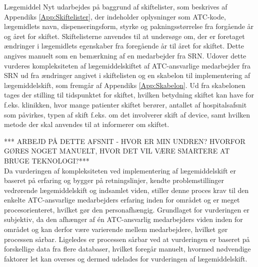 Lægemiddel Nyt udarbejdes på baggrund af skiftelister, som beskrives af Appendiks \ref{App:Skiftelister}, der indeholder oplysninger som ATC-kode, lægemidlets navn, dispenseringsform, styrke og pakningsstørrelse fra forgående år og året for skiftet. Skiftelisterne anvendes til at undersøge om, der er foretaget ændringer i lægemidlets egenskaber fra foregående år til året for skiftet. Dette angives manuelt som en bemærkning af en medarbejder fra SRN. Udover dette vurderes kompleksiteten af lægemiddelskiftet af ATC-ansvarlige medarbejder fra SRN ud fra ændringer angivet i skiftelisten og en skabelon til implementering af lægemiddelskift, som fremgår af Appendiks \ref{App:Skabelon}. Ud fra skabelonen tages der stilling til tidspunktet for skiftet, hvilken betydning skiftet kan have for f.eks. klinikken, hvor mange patienter skiftet berører, antallet af hospitalsafsnit som påvirkes, typen af skift f.eks. om det involverer skift af device, samt hvilken metode der skal anvendes til at informerer om skiftet. 


*** ARBEJD PÅ DETTE AFSNIT - HVOR ER MIN UNDREN? HVORFOR GØRES NOGET MANUELT, HVOR DET VIL VÆRE SMARTERE AT BRUGE TEKNOLOGI?*** \\
Da vurderingen af kompleksiteten ved implementering af lægemiddelskift er baseret på erfaring og bygger på retningslinjer, kendte problemstillinger vedrørende lægemiddelskift og indsamlet viden, stiller denne proces krav til den enkelte ATC-ansvarlige medarbejders erfaring inden for området og er meget procesorienteret, hvilket gør den personafhængig.  
Grundlaget for vurderingen er subjektiv, da den afhænger af én ATC-ansvarlig medarbejders viden inden for området og kan derfor være varierende mellem medarbejdere, hvilket gør processen sårbar. 
Ligeledes er processen sårbar ved at vurderingen er baseret på forskellige data fra flere databaser, hvilket foregår manuelt, hvormed nødvendige faktorer let kan overses og dermed udelades for vurderingen af lægemiddelskift.









